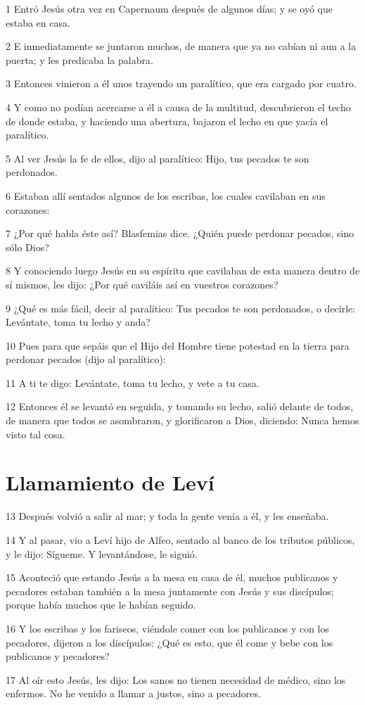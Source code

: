 \par 1 Entró Jesús otra vez en Capernaum después de algunos días; y se oyó que estaba en casa.
\par 2 E inmediatamente se juntaron muchos, de manera que ya no cabían ni aun a la puerta; y les predicaba la palabra.
\par 3 Entonces vinieron a él unos trayendo un paralítico, que era cargado por cuatro.
\par 4 Y como no podían acercarse a él a causa de la multitud, descubrieron el techo de donde estaba, y haciendo una abertura, bajaron el lecho en que yacía el paralítico.
\par 5 Al ver Jesús la fe de ellos, dijo al paralítico: Hijo, tus pecados te son perdonados.
\par 6 Estaban allí sentados algunos de los escribas, los cuales cavilaban en sus corazones:
\par 7 ¿Por qué habla éste así? Blasfemias dice. ¿Quién puede perdonar pecados, sino sólo Dios?
\par 8 Y conociendo luego Jesús en su espíritu que cavilaban de esta manera dentro de sí mismos, les dijo: ¿Por qué caviláis así en vuestros corazones?
\par 9 ¿Qué es más fácil, decir al paralítico: Tus pecados te son perdonados, o decirle: Levántate, toma tu lecho y anda?
\par 10 Pues para que sepáis que el Hijo del Hombre tiene potestad en la tierra para perdonar pecados (dijo al paralítico):
\par 11 A ti te digo: Levántate, toma tu lecho, y vete a tu casa.
\par 12 Entonces él se levantó en seguida, y tomando su lecho, salió delante de todos, de manera que todos se asombraron, y glorificaron a Dios, diciendo: Nunca hemos visto tal cosa.

\section*{Llamamiento de Leví}

\par 13 Después volvió a salir al mar; y toda la gente venía a él, y les enseñaba.
\par 14 Y al pasar, vio a Leví hijo de Alfeo, sentado al banco de los tributos públicos, y le dijo: Sígueme. Y levantándose, le siguió.
\par 15 Aconteció que estando Jesús a la mesa en casa de él, muchos publicanos y pecadores estaban también a la mesa juntamente con Jesús y sus discípulos; porque había muchos que le habían seguido.
\par 16 Y los escribas y los fariseos, viéndole comer con los publicanos y con los pecadores, dijeron a los discípulos: ¿Qué es esto, que él come y bebe con los publicanos y pecadores?
\par 17 Al oír esto Jesús, les dijo: Los sanos no tienen necesidad de médico, sino los enfermos. No he venido a llamar a justos, sino a pecadores.

